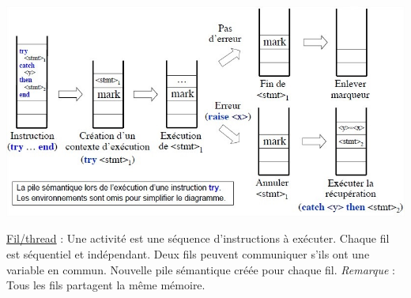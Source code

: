 \documentclass[fr,license=none]{../../../eplsummary}
\begin{document}
\begin{flushleft}
\begin{center}
\includegraphics[scale=0.7]{Exc.jpg}
\end{center}
\bigbreak


\textcolor{mauvedef}{\underline{Fil/thread}} : Une activité est une séquence d’instructions à exécuter. Chaque fil est séquentiel et indépendant. Deux fils peuvent communiquer s'ils ont une variable en commun. Nouvelle pile sémantique créée pour chaque fil. \textit{Remarque} : Tous les fils partagent la même mémoire. 


\end{flushleft}
\end{document}
